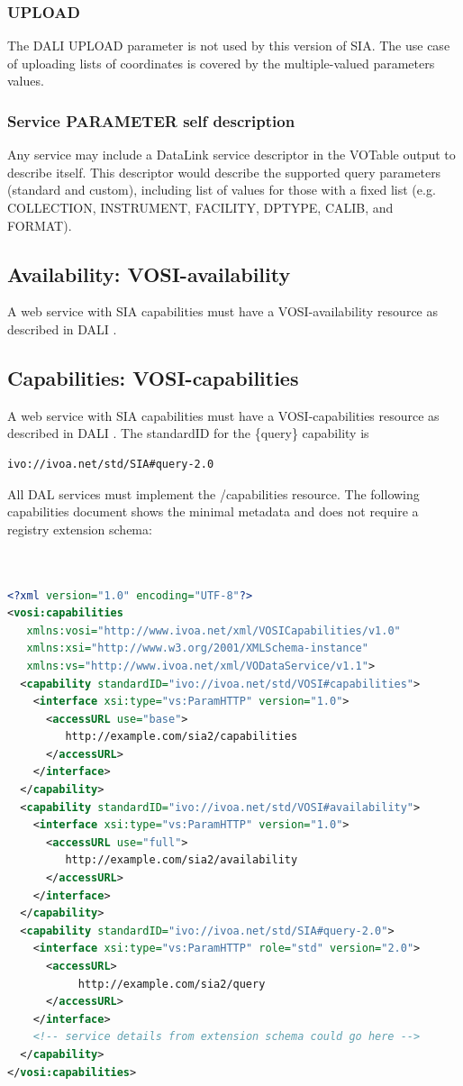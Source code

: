 \documentclass[11pt,a4paper]{ivoa}
\begin{document}
\subsubsection{UPLOAD}
 The DALI UPLOAD parameter is not used by this version of SIA. The use case of uploading lists of coordinates is covered by the multiple-valued parameters values.

\subsubsection{Service PARAMETER self description}
Any service may  include a DataLink service descriptor in the VOTable output to describe itself. This descriptor would describe the supported query parameters (standard and custom), including list of values for those with a fixed list (e.g. COLLECTION, INSTRUMENT, FACILITY, DPTYPE, CALIB, and FORMAT).

\subsection{Availability: VOSI-availability}
A web service with SIA capabilities must have a VOSI-availability resource \citep{std:VOSI}  as described in DALI .
\subsection{Capabilities: VOSI-capabilities}
A web service with SIA capabilities must have a VOSI-capabilities resource \citep{std:VOSI} as described in DALI . The standardID for the \{query\} capability is 

\begin{lstlisting}
ivo://ivoa.net/std/SIA#query-2.0
\end{lstlisting}

All DAL services must implement the /capabilities resource. The following capabilities document shows the minimal metadata and does not require a registry extension schema:

\begin{lstlisting}[language=XML]


<?xml version="1.0" encoding="UTF-8"?>
<vosi:capabilities 
   xmlns:vosi="http://www.ivoa.net/xml/VOSICapabilities/v1.0" 
   xmlns:xsi="http://www.w3.org/2001/XMLSchema-instance" 
   xmlns:vs="http://www.ivoa.net/xml/VODataService/v1.1">
  <capability standardID="ivo://ivoa.net/std/VOSI#capabilities">
    <interface xsi:type="vs:ParamHTTP" version="1.0">
      <accessURL use="base">
         http://example.com/sia2/capabilities
      </accessURL>
    </interface>
  </capability>
  <capability standardID="ivo://ivoa.net/std/VOSI#availability">
    <interface xsi:type="vs:ParamHTTP" version="1.0">
      <accessURL use="full">
         http://example.com/sia2/availability
      </accessURL>
    </interface>
  </capability>
  <capability standardID="ivo://ivoa.net/std/SIA#query-2.0">
    <interface xsi:type="vs:ParamHTTP" role="std" version="2.0">
      <accessURL>
           http://example.com/sia2/query
      </accessURL>
    </interface>
    <!-- service details from extension schema could go here -->
  </capability>
</vosi:capabilities>
\end{lstlisting}
\end{document}
